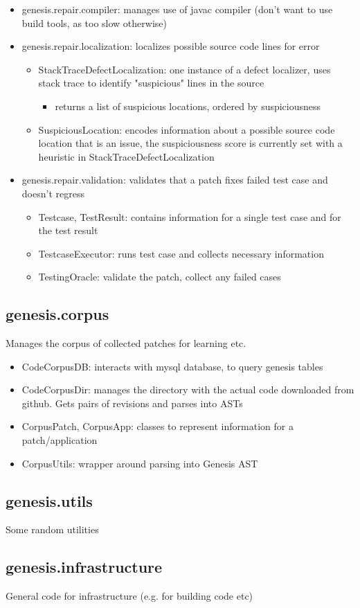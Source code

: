 \documentclass{article}
\begin{document}
\begin{itemize}
	\item genesis.repair.compiler: manages use of javac compiler (don't want to use build tools, as too slow otherwise)
	\item genesis.repair.localization: localizes possible source code lines for error
	\begin{itemize}
		\item StackTraceDefectLocalization: one instance of a defect localizer, uses stack trace to identify "suspicious" lines in the source
			\begin{itemize} 
				\item returns a list of suspicious locations, ordered by suspiciousness
			\end{itemize}
		\item SuspiciousLocation: encodes information about a possible source code location that is an issue, the suspiciousness score is
  currently set with a heuristic in StackTraceDefectLocalization
  	\end{itemize}
	\item genesis.repair.validation: validates that a patch fixes failed test case and doesn't regress
	\begin{itemize}
		\item Testcase, TestResult: contains information for a single test case and for the test result
		\item TestcaseExecutor: runs test case and collects necessary information
		\item TestingOracle: validate the patch, collect any failed cases
	\end{itemize}
\end{itemize}


\subsection{genesis.corpus}
Manages the corpus of collected patches for learning etc.

\begin{itemize}
	\item CodeCorpusDB: interacts with mysql database, to query genesis tables 
	\item CodeCorpusDir: manages the directory with the actual code downloaded from github. Gets pairs of revisions and parses into ASTs
	\item CorpusPatch, CorpusApp: classes to represent information for a patch/application
	\item CorpusUtils: wrapper around parsing into Genesis AST
\end{itemize}

\subsection{genesis.utils}
Some random utilities

\subsection{genesis.infrastructure}
General code for infrastructure (e.g. for building code etc)
\end{document}
